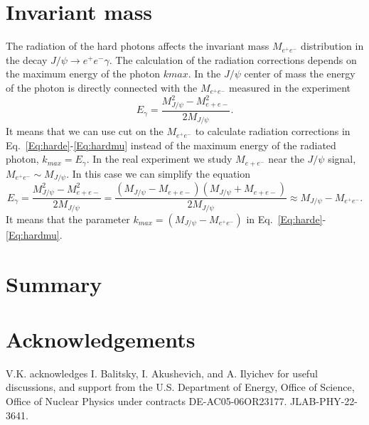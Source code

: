 \documentclass[prd,onecolumn,showpcs,amsmath,amssymb,nofootinbib,notitlepage,preprintnumbers,balancelastpage,longbibliography]{revtex4-2}
\begin{document}
\section{Invariant mass}
The radiation of the hard photons affects the invariant mass $M_{e^+e^-}$ distribution in the decay $J/\psi\to e^+e^-\gamma$. The calculation of the radiation corrections depends on the maximum energy of the photon $k{max}$. In the $J/\psi$ center of mass the energy of the photon is directly connected with the $M_{e^+e^-}$ measured in the experiment
\begin{equation}
E_\gamma = \frac {M_{J/\psi}^2-M^2_{e+e-}} {2M_{J/\psi}}.
\label{Eq:Egamma}
\end{equation}
It means that we can use cut on the $M_{e^+e^-}$ to calculate radiation corrections in Eq.~\ref{Eq:harde}-\ref{Eq:hardmu} instead of the maximum energy of the radiated photon, $k_{max}=E_\gamma$.
In the real experiment we study $M_{e+e^-}$ near the $J/\psi$ signal, $M_{e^+e^-}\sim M_{J/\psi}$. In this case we can simplify the equation 
\begin{equation}
E_\gamma = \frac {M_{J/\psi}^2-M^2_{e+e-}} {2M_{J/\psi}}=\frac {(M_{J/\psi}-M_{e+e-})(M_{J/\psi}+M_{e+e-})} {2M_{J/\psi}}\approx M_{J/\psi}-M_{e^+e^-}.
\label{Eq:deltaM}
\end{equation}
It means that the parameter $k_{max}=(M_{J/\psi}-M_{e^+e^-})$ in Eq.~\ref{Eq:harde}-\ref{Eq:hardmu}.
\noindent








\section{Summary}

\section*{Acknowledgements}
V.K. acknowledges I. Balitsky, I. Akushevich, and A. Ilyichev for useful discussions, and
support from the U.S. Department of Energy, Office of Science, Office of Nuclear Physics under contracts DE-AC05-06OR23177. JLAB-PHY-22-3641.  


\clearpage
\end{document}

